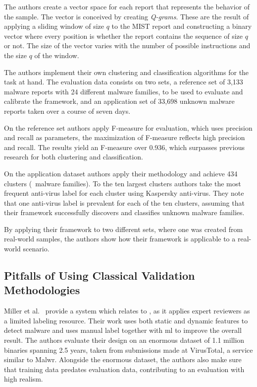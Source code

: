 The authors create a vector space for each report that represents the behavior of the sample.
The vector is conceived by creating \textit{Q-grams}.
These are the result of applying a sliding window of size $q$ to the MIST report and constructing a binary vector where every position is whether the report contains the sequence of size $q$ or not.
The size of the vector varies with the number of possible instructions and the size $q$ of the window.

The authors implement their own clustering and classification algorithms for the task at hand.
The evaluation data consists on two sets, a reference set of 3,133 malware reports with 24 different malware families, to be used to evaluate and calibrate the framework, and an application set of 33,698 unknown malware reports taken over a course of seven days.

On the reference set authors apply F-measure for evaluation, which uses precision and recall as parameters, the maximization of F-measure reflects high precision and recall.
The results yield an F-measure over 0.936, which surpasses previous research for both clustering and classification.

On the application dataset authors apply their methodology and achieve 434 clusters (\ie\ malware families).
To the ten largest clusters authors take the most frequent anti-virus label for each cluster using Kaspersky anti-virus.
They note that one anti-virus label is prevalent for each of the ten clusters, assuming that their framework successfully discovers and classifies unknown malware families.

By applying their framework to two different sets, where one was created from real-world samples, the authors show how their framework is applicable to a real-world scenario.

\subsection{Pitfalls of Using Classical Validation Methodologies}

Miller et al.~\cite{miller:rev_int} provide a system which relates to \cite{nissim:al_pdf}, as it applies expert reviewers as a limited labeling resource.
Their work uses both static and dynamic features to detect malware and uses manual label together with \gls{ml} to improve the overall result.
The authors evaluate their design on an enormous dataset of 1.1 million binaries spanning 2.5 years, taken from submissions made at VirusTotal, a service similar to Malwr.
Alongside the enormous dataset, the authors also make sure that training data predates evaluation data, contributing to an evaluation with high realism.

